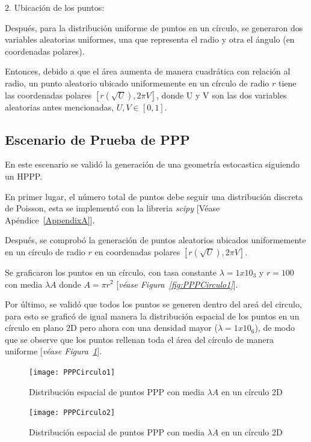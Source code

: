 2. Ubicación de los puntos:\newline

Después, para la distribución uniforme de puntos en un círculo, se generaron dos variables aleatorias uniformes, una que representa el radio y otra el ángulo (en coordenadas polares).\newline

Entonces, debido a que el área aumenta de manera cuadrática con relación al radio, un punto aleatorio ubicado uniformemente en un círculo de radio $r$ tiene las coordenadas polares $[r(\sqrt{U}), 2\pi V]$, donde U y V son las dos variables aleatorias antes mencionadas, $U, V \in{[0,1]}$.

\subsection{Escenario de Prueba de PPP}

En este escenario se validó la generación de una geometría estocastica siguiendo un HPPP.\newline

En primer lugar, el número total de puntos debe seguir una distribución discreta de Poisson, esta se implementó con la libreria \textit{scipy} [Véase Apéndice~\ref{AppendixA}].\newline

Después, se comprobó la generación de puntos aleatorios ubicados uniformemente en un círculo de radio $r$ en coordenadas polares $[r(\sqrt{U}), 2\pi V]$.\newline

Se graficaron los puntos en un círculo, con tasa constante $\lambda = 1x10_3$ y $r = 100$ con media $\lambda A$ donde $A=\pi r^{2}$ [\textit{véase Figura~\ref{fig:PPPCirculo1}}].

Por último, se validó que todos los puntos se generen dentro del areá del circulo, para esto se graficó de igual manera la distribución espacial de los puntos en un círculo en plano 2D pero ahora con una densidad mayor ($\lambda = 1x10_6$), de modo que se observe que los puntos rellenan toda el área del círculo de manera uniforme [\textit{véase Figura~\ref{fig:PPPCirculo2}}].

\begin{figure}
    \centering
    \begin{minipage}{.45\linewidth}
      \texttt{[image: PPPCirculo1]}
      \caption[Distribución espacial de puntos PPP en un círculo 2D]{Distribución espacial de puntos PPP con media $\lambda A$ en un círculo 2D}
      \label{fig:PPPCirculo1}
    \end{minipage}
    \hspace{.05\linewidth}
    \begin{minipage}{.45\linewidth}
      \texttt{[image: PPPCirculo2]}
      \caption[Distribución espacial de puntos PPP en un círculo 2D]{Distribución espacial de puntos PPP con media $\lambda A$ en un círculo 2D}
      \label{fig:PPPCirculo2}
    \end{minipage}
\end{figure}


